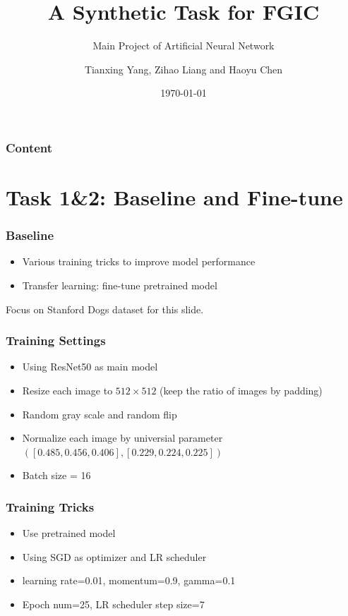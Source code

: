 \documentclass{beamer}
\title{A Synthetic Task for FGIC}
\subtitle{Main Project of Artificial Neural Network}
\author{Tianxing Yang, Zihao Liang and Haoyu Chen}
\institute{School of Computer Science and Engineering, SYSU}
\date{\today}
\begin{document}
    \begin{frame}
        \titlepage
    \end{frame}
    \begin{frame}
        \frametitle{Content}
        \tableofcontents[hideallsubsections]
    \end{frame}
    \section{Task 1\&2: Baseline and Fine-tune}
        \begin{frame}
            \frametitle{Baseline}
            \begin{itemize}
                \item Various training tricks to improve model performance
                \item Transfer learning: fine-tune pretrained model
            \end{itemize}
            Focus on Stanford Dogs dataset for this slide.\par
        \end{frame}
        \begin{frame}
            \frametitle{Training Settings}
            \begin{itemize}
                \item Using ResNet50 as main model
                \item Resize each image to $512\times512$ (keep the ratio of images by padding)
                \item Random gray scale and random flip
                \item Normalize each image by universial parameter $([0.485, 0.456, 0.406], [0.229, 0.224, 0.225])$
                \item Batch size = 16
            \end{itemize}
        \end{frame}
        \begin{frame}
            \frametitle{Training Tricks}
            \begin{itemize}
                \item Use pretrained model
                \item Using SGD as optimizer and LR scheduler
                \item learning rate=0.01, momentum=0.9, gamma=0.1
                \item Epoch num=25, LR scheduler step size=7
            \end{itemize}
        \end{frame}
\end{document}
